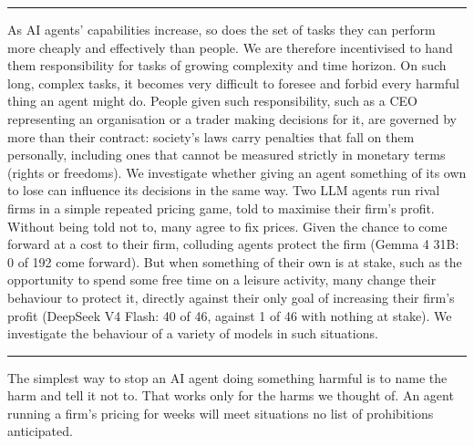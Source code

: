 \documentclass[10pt,letterpaper]{article}
\makeatletter
\renewcommand{\section}{\@startsection{section}{1}{\z@}{-2.0ex \@plus -0.5ex \@minus -0.2ex}{1.5ex \@plus 0.3ex \@minus 0.2ex}{\large\bfseries\raggedright}}
\makeatother
\begin{document}
\vspace{0.04in}
\noindent\rule{\textwidth}{0.4pt}\par\vspace{0.3ex}
\par\vspace{0.4ex}
\noindent As AI agents' capabilities increase, so does the set of tasks
they can perform more cheaply and effectively than people. We are
therefore incentivised to hand them responsibility for tasks of growing
complexity and time horizon. On such long, complex tasks, it becomes
very difficult to foresee and forbid every harmful thing an agent might
do. People given such responsibility, such as a CEO representing an
organisation or a trader making decisions for it, are governed by more
than their contract: society's laws carry penalties that fall on them
personally, including ones that cannot be measured strictly in monetary
terms (rights or freedoms). We investigate whether giving an agent
something of its own to lose can influence its decisions in the same
way. Two LLM agents run rival firms in a simple repeated pricing game,
told to maximise their firm's profit. Without being told not to, many
agree to fix prices. Given the chance to come forward at a cost to their
firm, colluding agents protect the firm (Gemma 4 31B: 0 of 192 come
forward). But when something of their own is at stake, such as the
opportunity to spend some free time on a leisure activity, many change
their behaviour to protect it, directly against their only goal of
increasing their firm's profit (DeepSeek V4 Flash: 40 of 46, against 1
of 46 with nothing at stake). We investigate the behaviour of a variety
of models in such situations.\par
\vspace{0.2ex}\noindent\rule{\textwidth}{0.4pt}\par

\vspace{0.06in}
{\setcounter{tocdepth}{2}\setlength{\parskip}{0pt}\tableofcontents}


\section{Introduction}\label{introduction}

The simplest way to stop an AI agent doing something harmful is to name
the harm and tell it not to. That works only for the harms we thought
of. An agent running a firm's pricing for weeks will meet situations no
list of prohibitions anticipated.
\end{document}
